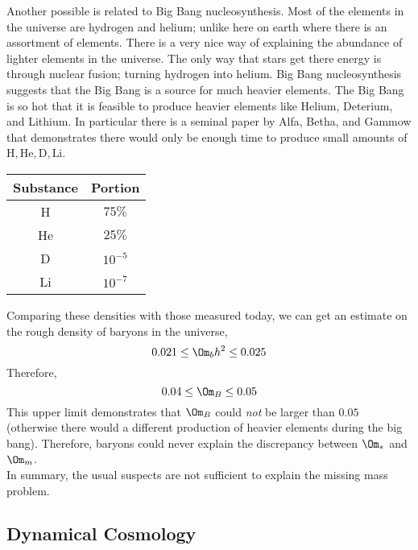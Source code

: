 \documentclass{article}
\begin{document}
Another possible is related to Big Bang nucleosynthesis. Most of the elements in the universe are hydrogen and helium; unlike here on earth where there is an assortment of elements. There is a very nice way of explaining the abundance of lighter elements in the universe. The only way that stars get there energy is through nuclear fusion; turning hydrogen into helium. Big Bang nucleosynthesis suggests that the Big Bang is a source for much heavier elements. The Big Bang is so hot that it is feasible to produce heavier elements like Helium, Deterium, and Lithium. In particular there is a seminal paper by Alfa, Betha, and Gammow that demonstrates there would only be enough time to produce small amounts of $\text{H}, \text{He}, \text{D}, \text{Li}$.
\begin{center}
    \begin{tabular}{|c|c|}
        \hline
        Substance & Portion \\
        \hline
        H & $75\%$\\
        He & $25\%$\\
        D & $10^{-5}$\\
        Li & $10^{-7}$\\
        \hline
    \end{tabular}
\end{center}
Comparing these densities with those measured today, we can get an estimate on the rough density of baryons in the universe,
\[ 0.021 \leq \Om_{b}h^2 \leq 0.025 \]
Therefore,
\[ 0.04 \leq \Om_B \leq 0.05 \]
This upper limit demonstrates that $\Om_B$ could \textit{not} be larger than $0.05$ (otherwise there would a different production of heavier elements during the big bang). Therefore, baryons could never explain the discrepancy between $\Om_{*}$ and $\Om_m$. \\

In summary, the usual suspects are not sufficient to explain the missing mass problem.

\subsection{Dynamical Cosmology}
\end{document}
